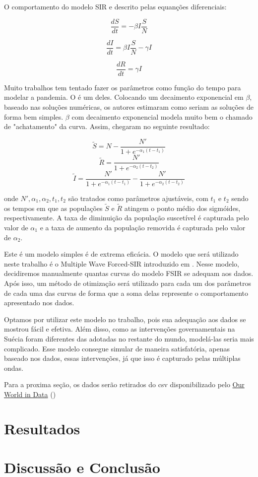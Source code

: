 \documentclass{article}
\begin{document}
O comportamento do modelo SIR e descrito pelas equanções diferenciais:

$$\frac{dS}{dt} = -\beta I \frac{S}{N}$$

$$\frac{dI}{dt} = \beta I \frac{S}{N} - \gamma I$$

$$\frac{dR}{dt} = \gamma I$$

Muito trabalhos tem tentado fazer os parâmetros como função do tempo para modelar a pandemia. O \citep{thefirst100days} é um deles. Colocando um decaimento exponencial em $\beta$, baseado nas soluções numéricas, os autores estimaram como seriam as soluções de forma bem simples. $\beta$ com decaimento exponencial modela muito bem o chamado de "achatamento" da curva. Assim, chegaram no seguinte resultado:

$$\tilde{S} = N-\frac{N'}{1+e^{-\alpha_1(t-t_1)}}$$
$$\tilde{R} = \frac{N'}{1+e^{-\alpha_2(t-t_2)}}$$
$$\tilde{I} = \frac{N'}{1+e^{-\alpha_1(t-t_1)}}-\frac{N'}{1+e^{-\alpha_2(t-t_2)}}$$

onde $N',\alpha_1,\alpha_2,t_1,t_2$ são tratados como parâmetros ajustáveis, com $t_1$ e $t_2$ sendo os tempos em que as populações $\tilde{S}$ e $\tilde{R}$ atingem o ponto médio dos sigmóides, respectivamente. A taxa de diminuição da população suscetível é capturada pelo valor de $\alpha_1$ e a taxa de aumento da população removida é capturada pelo valor de $\alpha_2$.

Este é um modelo simples é de extrema eficácia. O modelo que será utilizado neste trabalho é o Multiple Wave Forced-SIR introduzido em \citep{multiwave}. Nesse modelo, decidiremos manualmente quantas curvas do modelo FSIR se adequam aos dados. Após isso, um método de otimização será utilizado para cada um dos parâmetros de cada uma das curvas de forma que a soma delas represente o comportamento apresentado nos dados.

Optamos por utilizar este modelo no trabalho, pois sua adequação aos dados se mostrou fácil e efetiva. Além disso, como as intervenções governamentais na Suécia foram diferentes das adotadas no restante do mundo, modelá-las seria mais complicado. Esse modelo consegue simular de maneira satisfatória, apenas baseado nos dados, essas intervenções, já que isso é capturado pelas múltiplas ondas.

Para a proxima seção, os dados serão retirados do csv disponibilizado pelo \href{https://ourworldindata.org/coronavirus}{Our World in Data} (\citep{ourworldindata})

\section{Resultados}

\section{Discussão e Conclusão}

\nocite{*}



\end{document}
